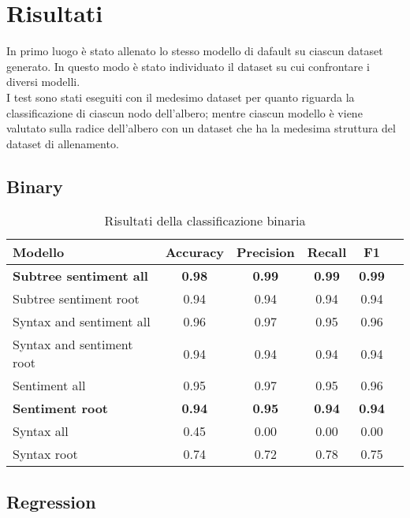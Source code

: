 \section{Risultati}

In primo luogo è stato allenato lo stesso modello di dafault su ciascun dataset
generato. In questo modo è stato individuato il dataset su cui confrontare i
diversi modelli.\\
I test sono stati eseguiti con il medesimo dataset per quanto
riguarda la classificazione di ciascun nodo dell'albero; mentre ciascun modello 
è viene valutato sulla radice dell'albero con un dataset che ha la medesima 
struttura del dataset di allenamento.

\subsection{Binary}

\begin{table}[H]
    \centering
    \begin{tabular}{|l|c|c|c|c|c|}
    \hline
    Modello & Accuracy & Precision & Recall & F1 \\
    \hline
    \textbf{Subtree sentiment all} & \textbf{0.98} & \textbf{0.99} & \textbf{0.99} & \textbf{0.99} \\
    Subtree sentiment root & 0.94 & 0.94 & 0.94 & 0.94 \\
    \hline

    Syntax and sentiment all & 0.96 & 0.97 & 0.95 & 0.96 \\
    Syntax and sentiment root & 0.94 & 0.94 & 0.94 & 0.94 \\
    \hline

    Sentiment all & 0.95 & 0.97 & 0.95 & 0.96 \\
    \textbf{Sentiment root} & \textbf{0.94} & \textbf{0.95} & \textbf{0.94}
        & \textbf{0.94} \\
    \hline

    Syntax all & 0.45 & 0.00 & 0.00 & 0.00 \\
    Syntax root & 0.74 & 0.72 & 0.78 & 0.75 \\
    \hline
    \end{tabular}
    \caption{Risultati della classificazione binaria}
\end{table}

\subsection{Regression}

